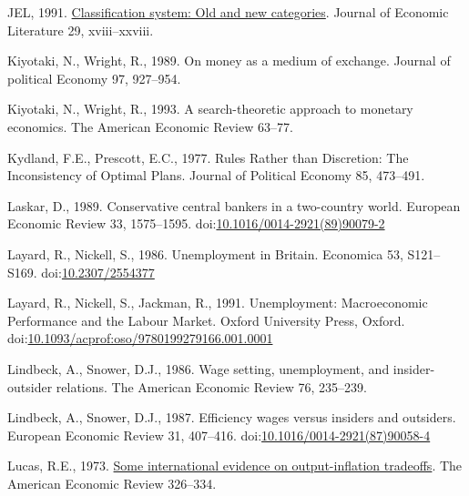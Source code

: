 \documentclass[]{elsarticle} %
\newlength{\cslhangindent}
\newlength{\cslentryspacingunit} %
\newenvironment{CSLReferences}[2] %
 {%
  \setlength{\parindent}{0pt}
  \ifodd #1
  \let\oldpar\par
  \def\par{\hangindent=\cslhangindent\oldpar}
  \fi
  \setlength{\parskip}{#2\cslentryspacingunit}
 }%
 {}
\begin{document}
\begin{CSLReferences}{1}{0}
\leavevmode{}%
JEL, 1991. \href{https://www.jstor.org/stable/2727351}{Classification
system: Old and new categories}. Journal of Economic Literature 29,
xviii--xxviii.

\leavevmode{}%
Kiyotaki, N., Wright, R., 1989. On money as a medium of exchange.
Journal of political Economy 97, 927--954.

\leavevmode{}%
Kiyotaki, N., Wright, R., 1993. A search-theoretic approach to monetary
economics. The American Economic Review 63--77.

\leavevmode{}%
Kydland, F.E., Prescott, E.C., 1977. Rules {Rather} than {Discretion}:
{The Inconsistency} of {Optimal Plans}. Journal of Political Economy 85,
473--491.

\leavevmode{}%
Laskar, D., 1989. Conservative central bankers in a two-country world.
European Economic Review 33, 1575--1595.
doi:\href{https://doi.org/10.1016/0014-2921(89)90079-2}{10.1016/0014-2921(89)90079-2}

\leavevmode{}%
Layard, R., Nickell, S., 1986. Unemployment in {Britain}. Economica 53,
S121--S169. doi:\href{https://doi.org/10.2307/2554377}{10.2307/2554377}

\leavevmode{}%
Layard, R., Nickell, S., Jackman, R., 1991. Unemployment: {Macroeconomic
Performance} and the {Labour Market}. {Oxford University Press},
{Oxford}.
doi:\href{https://doi.org/10.1093/acprof:oso/9780199279166.001.0001}{10.1093/acprof:oso/9780199279166.001.0001}

\leavevmode{}%
Lindbeck, A., Snower, D.J., 1986. Wage setting, unemployment, and
insider-outsider relations. The American Economic Review 76, 235--239.

\leavevmode{}%
Lindbeck, A., Snower, D.J., 1987. Efficiency wages versus insiders and
outsiders. European Economic Review 31, 407--416.
doi:\href{https://doi.org/10.1016/0014-2921(87)90058-4}{10.1016/0014-2921(87)90058-4}

\leavevmode{}%
Lucas, R.E., 1973. \href{http://www.jstor.org/stable/1914364}{Some
international evidence on output-inflation tradeoffs}. The American
Economic Review 326--334.


\end{CSLReferences}
\end{document}
